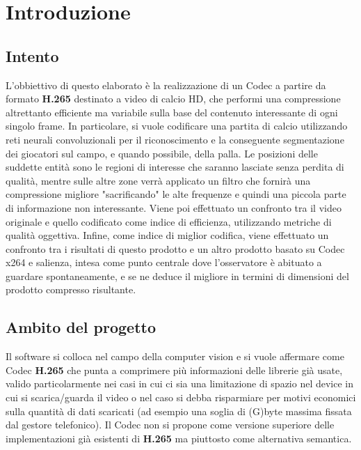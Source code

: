 \chapter{Introduzione}
\label{chap:intro}

\section{Intento}
\label{sec:intento}

L'obbiettivo di questo elaborato è la realizzazione di un Codec a partire da formato \textbf{H.265} destinato a video di calcio HD, che performi una compressione altrettanto efficiente ma variabile sulla base del contenuto interessante di ogni singolo frame.
In particolare, si vuole codificare una partita di calcio utilizzando reti neurali convoluzionali per il riconoscimento e la conseguente segmentazione dei giocatori sul campo, e quando possibile, della palla. 
Le posizioni delle suddette entità sono le regioni di interesse che saranno lasciate senza perdita di qualità, mentre sulle altre zone verrà applicato un filtro che fornirà una compressione migliore "sacrificando" le alte frequenze e quindi una piccola parte di informazione non interessante. Viene poi effettuato un confronto tra il video originale e quello codificato come indice di efficienza, utilizzando metriche di qualità oggettiva. Infine, come indice di miglior codifica, viene effettuato un confronto tra i risultati di questo prodotto e un altro prodotto basato su Codec x264 e salienza, intesa come punto centrale dove l'osservatore è abituato a guardare spontaneamente, e se ne deduce il migliore in termini di dimensioni del prodotto compresso risultante.


\section{Ambito del progetto}
\label{sec:projscope}
Il software si colloca nel campo della computer vision e si vuole affermare come Codec \textbf{H.265} che punta a comprimere più informazioni delle librerie già usate, valido particolarmente nei casi in cui ci sia una limitazione di spazio nel device in cui si scarica/guarda il video o nel caso si debba risparmiare per motivi economici sulla quantità di dati scaricati (ad esempio una soglia di (G)byte massima fissata dal gestore telefonico). 
Il Codec non si propone come versione superiore delle implementazioni già esistenti di \textbf{H.265} ma piuttosto come alternativa semantica.
\\